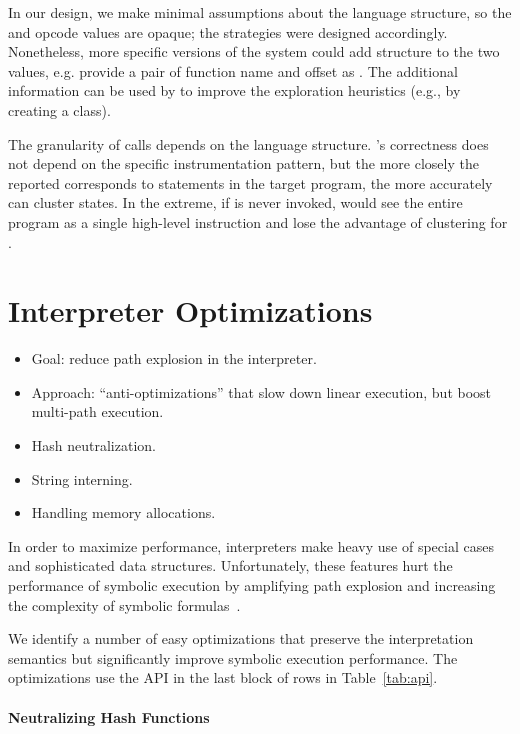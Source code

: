In our design, we make minimal assumptions about the language structure, so the \hlpc and opcode values are opaque; the \cupa strategies were designed accordingly.  Nonetheless, more specific versions of the system could add structure to the two values, e.g. provide a pair of function name and offset as \hlpc.  The additional information can be used by \chef to improve the exploration heuristics (e.g., by creating a \cupa class).

The granularity of  calls depends on the language structure.  \chef's correctness does not depend on the specific instrumentation pattern, but the more closely the reported \hlpc corresponds to statements in the target program, the more accurately \cupa can cluster states. In the extreme, if  is never invoked, \chef would see the entire program as a single high-level instruction and lose the advantage of \cupa clustering for \hlpcs.


\section{Interpreter Optimizations}
\label{sec:optimzeforsymbex}

\begin{itemize}
\item Goal: reduce path explosion in the interpreter.
\item Approach: ``anti-optimizations'' that slow down linear execution, but boost multi-path execution.
\item Hash neutralization.
\item String interning.
\item Handling memory allocations.
\end{itemize}

In order to maximize performance, interpreters make heavy use of special cases and sophisticated data structures.  Unfortunately, these features hurt the performance of symbolic execution by amplifying path explosion and increasing the complexity of symbolic formulas~\cite{overify}.

We identify a number of easy optimizations that preserve the interpretation semantics but significantly improve symbolic execution performance.  The optimizations use the \chef API in the last block of rows in Table~\ref{tab:api}.

\paragraph{Neutralizing Hash Functions}

